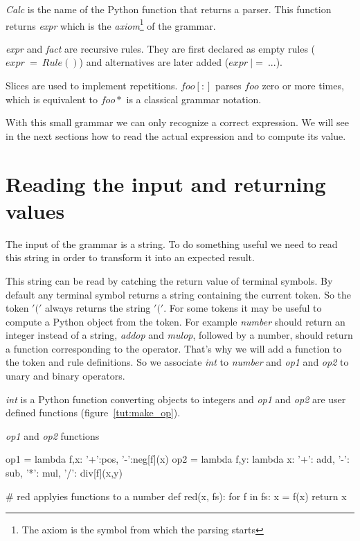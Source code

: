 \emph{Calc} is the name of the Python function that returns a parser. This function returns \emph{expr} which is the \emph{axiom}\footnote{The axiom is the symbol from which the parsing starts} of the grammar.

\emph{expr} and \emph{fact} are recursive rules. They are first declared as empty rules ($expr~=~Rule()$) and alternatives are later added ($expr~|=~...$).

Slices are used to implement repetitions. $foo[:]$ parses $foo$ zero or more times, which is equivalent to $foo*$ is a classical grammar notation.

With this small grammar we can only recognize a correct expression. We will see in the next sections how to read the actual expression and to compute its value.

\section{Reading the input and returning values}

The input of the grammar is a string. To do something useful we need to read this string in order to transform it into an expected result.

This string can be read by catching the return value of terminal symbols. By default any terminal symbol returns a string containing the current token. So the token $'('$ always returns the string $'('$. For some tokens it may be useful to compute a Python object from the token. For example \emph{number} should return an integer instead of a string, \emph{addop} and \emph{mulop}, followed by a number, should return a function corresponding to the operator. That's why we will add a function to the token and rule definitions. So we associate \emph{int} to \emph{number} and \emph{op1} and \emph{op2} to unary and binary operators.

\emph{int} is a Python function converting objects to integers and \emph{op1} and \emph{op2} are user defined functions (figure~\ref{tut:make_op}).

\begin{code}
\caption{\emph{op1} and \emph{op2} functions}                          \label{tut:make_op}
\begin{verbatimtab}[4]
    op1 = lambda f,x: {'+':pos, '-':neg}[f](x)
    op2 = lambda f,y: lambda x: {'+': add, '-': sub, '*': mul, '/': div}[f](x,y)

    # red applyies functions to a number
    def red(x, fs):
        for f in fs: x = f(x)
        return x
\end{verbatimtab}
\end{code}

